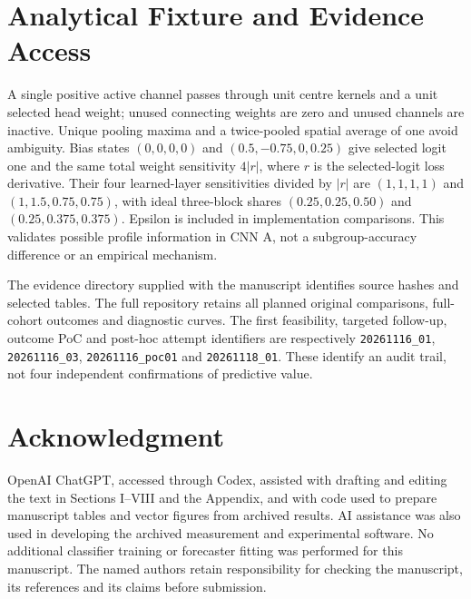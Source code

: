 \documentclass[nolineno]{ieeeaccess}
\begin{document}
\appendices
\section{Analytical Fixture and Evidence Access}
\label{app:fixture}
A single positive active channel passes through unit centre kernels and a unit selected head weight; unused connecting weights are zero and unused channels are inactive. Unique pooling maxima and a twice-pooled spatial average of one avoid ambiguity. Bias states $(0,0,0,0)$ and $(0.5,-0.75,0,0.25)$ give selected logit one and the same total weight sensitivity $4|r|$, where $r$ is the selected-logit loss derivative. Their four learned-layer sensitivities divided by $|r|$ are $(1,1,1,1)$ and $(1,1.5,0.75,0.75)$, with ideal three-block shares $(0.25,0.25,0.50)$ and $(0.25,0.375,0.375)$. Epsilon is included in implementation comparisons. This validates possible profile information in CNN A, not a subgroup-accuracy difference or an empirical mechanism.

The evidence directory supplied with the manuscript identifies source hashes and selected tables. The full repository retains all planned original comparisons, full-cohort outcomes and diagnostic curves. The first feasibility, targeted follow-up, outcome PoC and post-hoc attempt identifiers are respectively \texttt{20261116\_01}, \texttt{20261116\_03}, \texttt{20261116\_poc01} and \texttt{20261118\_01}. These identify an audit trail, not four independent confirmations of predictive value.

\section*{Acknowledgment}
OpenAI ChatGPT, accessed through Codex, assisted with drafting and editing the text in Sections I--VIII and the Appendix, and with code used to prepare manuscript tables and vector figures from archived results. AI assistance was also used in developing the archived measurement and experimental software. No additional classifier training or forecaster fitting was performed for this manuscript. The named authors retain responsibility for checking the manuscript, its references and its claims before submission.


\EOD
\end{document}
